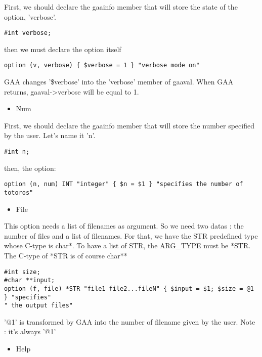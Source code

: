 First, we should declare the gaainfo member that will store the state
of the option, 'verbose'.

\begin{verbatim}
#int verbose;
\end{verbatim}
then we must declare the option itself

\begin{verbatim}
option (v, verbose) { $verbose = 1 } "verbose mode on"
\end{verbatim}

GAA changes '\$verbose' into the 'verbose'
member of gaaval. When GAA returns, gaaval->verbose will be equal to 1.

\begin{itemize}
\item Num
\end{itemize}

First, we should declare the gaainfo member that will store the number
specified by the user. Let's name it 'n'.

\begin{verbatim}
#int n;
\end{verbatim}

then, the option:

\begin{verbatim}
option (n, num) INT "integer" { $n = $1 } "specifies the number of totoros"
\end{verbatim}

\begin{itemize}
\item File
\end{itemize}

This option needs a list of filenames as argument.
So we need two datas : the number of files and a list of filenames. For
that, we have the STR predefined type whose C-type is char*. To have a
list of STR, the ARG\_TYPE must be *STR. The C-type of *STR is of course
char**

\begin{verbatim}
#int size;
#char **input;
option (f, file) *STR "file1 file2...fileN" { $input = $1; $size = @1 } "specifies"
" the output files"
\end{verbatim}

'@1' is transformed by GAA into the number of filename
given by the user. Note : it's always '@1'

\begin{itemize}
\item Help
\end{itemize}

